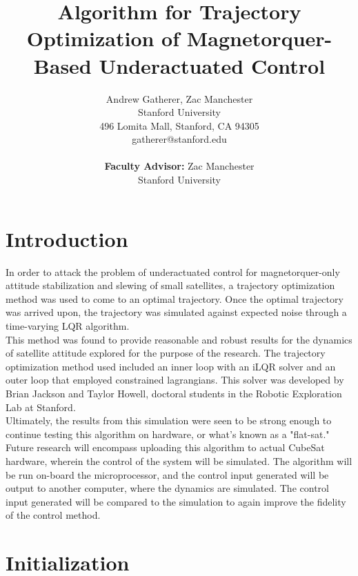 \documentclass[10pt,notitlepage,twocolumn]{article}
\begin{document}
\title{Algorithm for Trajectory Optimization of Magnetorquer-Based Underactuated Control}
\author{Andrew Gatherer, Zac Manchester\\
Stanford University \\
496 Lomita Mall, Stanford, CA 94305\\
gatherer@stanford.edu\\
\\
\textbf{Faculty Advisor:} Zac Manchester\\
Stanford University}
\maketitle

\section{Introduction}
In order to attack the problem of underactuated control for magnetorquer-only attitude stabilization and slewing of small satellites, a trajectory optimization method was used to come to an optimal trajectory. Once the optimal trajectory was arrived upon, the trajectory was simulated against expected noise through a time-varying LQR algorithm. \\

This method was found to provide reasonable and robust results for the dynamics of satellite attitude explored for the purpose of the research. The trajectory optimization method used included an inner loop with an iLQR solver and an outer loop that employed constrained lagrangians. This solver was developed by Brian Jackson and Taylor Howell, doctoral students in the Robotic Exploration Lab at Stanford\cite{ALTRO}. \\

Ultimately, the results from this simulation were seen to be strong enough to continue testing this algorithm on hardware, or what's known as a "flat-sat." Future research will encompass uploading this algorithm to actual CubeSat hardware, wherein the control of the system will be simulated. The algorithm will be run on-board the microprocessor, and the control input generated will be output to another computer, where the dynamics are simulated. The control input generated will be compared to the simulation to again improve the fidelity of the control method. 

\section{Initialization}
\end{document}

